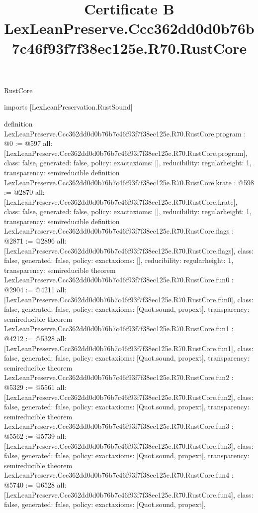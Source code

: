 \begin{lexlean}{RustCore}
\title{Certificate B LexLeanPreserve.Ccc362dd0d0b76b7c46f93f7f38ec125e.R70.RustCore}
\begin{coremodule}
imports [LexLeanPreservation.RustSound]

definition LexLeanPreserve.Ccc362dd0d0b76b7c46f93f7f38ec125e.R70.RustCore.program : @0 := @597 {
  all: [LexLeanPreserve.Ccc362dd0d0b76b7c46f93f7f38ec125e.R70.RustCore.program],
  class: false,
  generated: false,
  policy: exact{axioms: []},
  reducibility: regular{height: 1},
  transparency: semireducible
}
definition LexLeanPreserve.Ccc362dd0d0b76b7c46f93f7f38ec125e.R70.RustCore.krate : @598 := @2870 {
  all: [LexLeanPreserve.Ccc362dd0d0b76b7c46f93f7f38ec125e.R70.RustCore.krate],
  class: false,
  generated: false,
  policy: exact{axioms: []},
  reducibility: regular{height: 1},
  transparency: semireducible
}
definition LexLeanPreserve.Ccc362dd0d0b76b7c46f93f7f38ec125e.R70.RustCore.flags : @2871 := @2896 {
  all: [LexLeanPreserve.Ccc362dd0d0b76b7c46f93f7f38ec125e.R70.RustCore.flags],
  class: false,
  generated: false,
  policy: exact{axioms: []},
  reducibility: regular{height: 1},
  transparency: semireducible
}
theorem LexLeanPreserve.Ccc362dd0d0b76b7c46f93f7f38ec125e.R70.RustCore.fun0 : @2904 := @4211 {
  all: [LexLeanPreserve.Ccc362dd0d0b76b7c46f93f7f38ec125e.R70.RustCore.fun0],
  class: false,
  generated: false,
  policy: exact{axioms: [Quot.sound, propext]},
  transparency: semireducible
}
theorem LexLeanPreserve.Ccc362dd0d0b76b7c46f93f7f38ec125e.R70.RustCore.fun1 : @4212 := @5328 {
  all: [LexLeanPreserve.Ccc362dd0d0b76b7c46f93f7f38ec125e.R70.RustCore.fun1],
  class: false,
  generated: false,
  policy: exact{axioms: [Quot.sound, propext]},
  transparency: semireducible
}
theorem LexLeanPreserve.Ccc362dd0d0b76b7c46f93f7f38ec125e.R70.RustCore.fun2 : @5329 := @5561 {
  all: [LexLeanPreserve.Ccc362dd0d0b76b7c46f93f7f38ec125e.R70.RustCore.fun2],
  class: false,
  generated: false,
  policy: exact{axioms: [Quot.sound, propext]},
  transparency: semireducible
}
theorem LexLeanPreserve.Ccc362dd0d0b76b7c46f93f7f38ec125e.R70.RustCore.fun3 : @5562 := @5739 {
  all: [LexLeanPreserve.Ccc362dd0d0b76b7c46f93f7f38ec125e.R70.RustCore.fun3],
  class: false,
  generated: false,
  policy: exact{axioms: [Quot.sound, propext]},
  transparency: semireducible
}
theorem LexLeanPreserve.Ccc362dd0d0b76b7c46f93f7f38ec125e.R70.RustCore.fun4 : @5740 := @6528 {
  all: [LexLeanPreserve.Ccc362dd0d0b76b7c46f93f7f38ec125e.R70.RustCore.fun4],
  class: false,
  generated: false,
  policy: exact{axioms: [Quot.sound, propext]},
}
\end{coremodule}
\end{lexlean}
